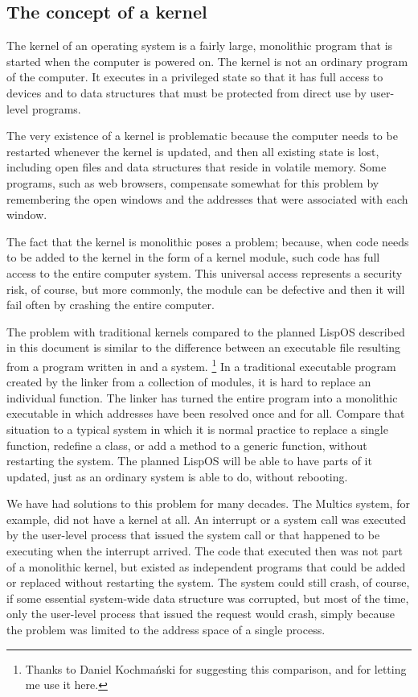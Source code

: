 \subsection{The concept of a kernel}

The kernel of an operating system is a fairly large, monolithic
program that is started when the computer is powered on. The kernel is
not an ordinary program of the computer. It executes in a privileged
state so that it has full access to devices and to data structures
that must be protected from direct use by user-level programs.

The very existence of a kernel is problematic because the computer
needs to be restarted whenever the kernel is updated, and then all
existing state is lost, including open files and data structures that
reside in volatile memory. Some programs, such as web browsers,
compensate somewhat for this problem by remembering the open windows
and the addresses that were associated with each window.

The fact that the kernel is monolithic poses a problem; because, when
code needs to be added to the kernel in the form of a kernel module,
such code has full access to the entire computer system. This
universal access represents a security risk, of course, but more
commonly, the module can be defective and then it will fail often by
crashing the entire computer.

The problem with traditional kernels compared to the planned LispOS
described in this document is similar to the difference between an
executable file resulting from a program written in \clanguage{} and a
\commonlisp{} system.%
\footnote{Thanks to Daniel Kochmański for suggesting this comparison,
  and for letting me use it here.}  In a traditional executable
program created by the linker from a collection of modules, it is hard
to replace an individual function.  The linker has turned the entire
program into a monolithic executable in which addresses have been
resolved once and for all.  Compare that situation to a typical
\commonlisp{} system in which it is normal practice to replace a
single function, redefine a class, or add a method to a generic
function, without restarting the \commonlisp{} system.  The planned
LispOS will be able to have parts of it updated, just as an ordinary
\commonlisp{} system is able to do, without rebooting.

We have had solutions to this problem for many decades. The Multics
system, for example, did not have a kernel at all. An interrupt or a
system call was executed by the user-level process that issued the
system call or that happened to be executing when the interrupt
arrived. The code that executed then was not part of a monolithic
kernel, but existed as independent programs that could be added or
replaced without restarting the system. The system could still crash,
of course, if some essential system-wide data structure was corrupted,
but most of the time, only the user-level process that issued the
request would crash, simply because the problem was limited to the
address space of a single process.

